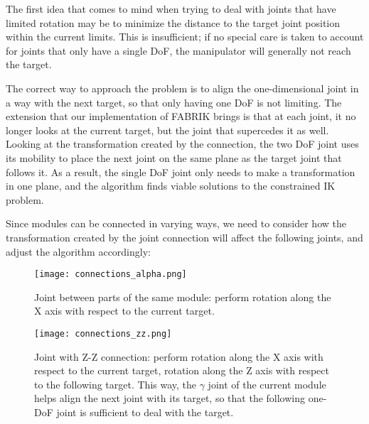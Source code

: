 The first idea that comes to mind when trying to deal with joints that have limited rotation may be to minimize the distance to the target joint position within the current limits. This is insufficient; if no special care is taken to account for joints that only have a single DoF, the manipulator will generally not reach the target.


The correct way to approach the problem is to align the one-dimensional joint in a way with the next target, so that only having one DoF is not limiting. The extension that our implementation of FABRIK brings is that at each joint, it no longer looks at the current target, but the joint that supercedes it as well. Looking at the transformation created by the connection, the two DoF joint uses its mobility to place the next joint on the same plane as the target joint that follows it. As a result, the single DoF joint only needs to make a transformation in one plane, and the algorithm finds viable solutions to the constrained IK problem.

Since modules can be connected in varying ways, we need to consider how the transformation created by the joint connection will affect the following joints, and adjust the algorithm accordingly:

\begin{figure}[h]
  \centering
  \texttt{[image: connections\_alpha.png]}
  \caption{Joint between parts of the same module: perform rotation along the X axis with respect to the current target.}
\end{figure}

\begin{figure}[h]
  \centering
  \texttt{[image: connections\_zz.png]}
  \caption{Joint with Z-Z connection: perform rotation along the X axis with respect to the current target, rotation along the Z axis with respect to the following target. This way, the $\gamma$ joint of the current module helps align the next joint with its target, so that the following one-DoF joint is sufficient to deal with the target.}
\end{figure}

